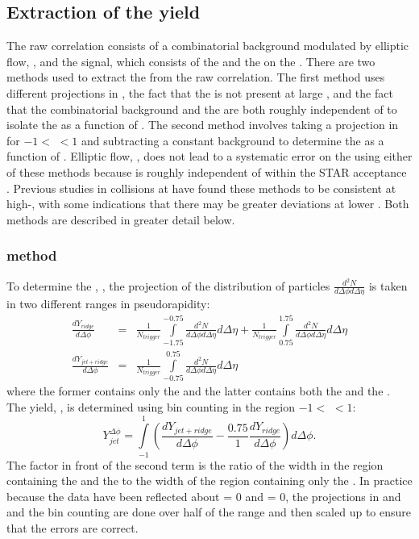 \subsection{Extraction of the \jl yield}

The raw correlation consists of a combinatorial background modulated by elliptic flow, \vtwo, and the signal, which consists of the \jlc and the \ridge on the \ns.  There are two methods used to extract the \jly from the raw correlation.  The first method uses different projections in \dphi, the fact that the \jlc is not present at large \deta, and the fact that the combinatorial background and the \ridge are both roughly independent of \deta to isolate the \jlc as a function of \dphi.  The second method involves taking a projection in \deta for $-1<$ \dphi $<1$ and subtracting a constant background to determine the \jlc as a function of \deta.  Elliptic flow, \vtwo, does not lead to a systematic error on the \jly using either of these methods because \vtwo is roughly independent of \deta within the STAR acceptance \cite{Back:2004mh,Back:2004zg}.  Previous studies in \Au collisions at \sNNtwohundred have found these methods to be consistent at high-\pT \cite{STAROANAPAPER}, with some indications that there may be greater deviations at lower \pT \cite{JOERNRIDGEPAPER}.  Both methods are described in greater detail below.

\subsubsection{\dphi method}
To determine the \jly, \njet, the projection of the distribution of particles $\frac{d^2N}{d\Delta\phi d\Delta\eta}$ is taken in two different ranges in pseudorapidity:
\begin{eqnarray}
  \frac{dY_{ridge}}{d\Delta\phi} & = & \frac{1}{N_{trigger}} \int\limits_{-1.75}^{-0.75} \frac{d^2N}{d\Delta\phi d\Delta\eta} d\Delta\eta 
   + \frac{1}{N_{trigger}} \int\limits_{0.75}^{1.75} \frac{d^2N}{d\Delta\phi d\Delta\eta} d\Delta\eta\\ \label{ridgeeqtn1}
\frac{dY_{jet+ridge}}{d\Delta\phi} &= &\frac{1}{N_{trigger}} \int\limits_{-0.75}^{0.75} \frac{d^2N}{d\Delta\phi d\Delta\eta} d\Delta\eta\label{jeteqtn1}
\end{eqnarray}
where the former contains only the \ridge and the latter contains both the \jlc and the \ridge.    The \jl yield, \njet, is determined using bin counting in the region $-1<$ \dphi $<1$:
\begin{equation}
Y_{jet}^{\Delta\phi} = \int\limits_{-1}^{1} ( \frac{dY_{jet+ridge}}{d\Delta\phi} - \frac{0.75}{1}  \frac{dY_{ridge}}{d\Delta\phi} ) d\Delta\phi. \label{jetphieqtn}
\end{equation}\label{dphieqtn}
The factor in front of the second term is the ratio of the \deta width in the region containing the \jlc and the \ridge to the width of the region containing only the \ridge.  In practice because the data have been reflected about \dphi = 0 and \deta = 0, the projections in \dphi and \deta and the bin counting are done over half of the range and then scaled up to ensure that the errors are correct.

